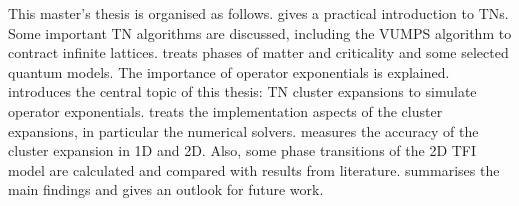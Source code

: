 This master's thesis is organised as follows.  gives a practical introduction to \Glspl{TN}. Some important \Gls{TN} algorithms are discussed, including the \Gls{VUMPS} algorithm to contract infinite lattices.  treats phases of matter and criticality and some selected quantum models. The importance of operator exponentials is explained.  introduces the central topic of this thesis: \Gls{TN} cluster expansions to simulate operator exponentials.  treats the implementation aspects of the cluster expansions, in particular the numerical solvers.  measures the accuracy of the cluster expansion in 1D and 2D. Also, some phase transitions of the 2D \Gls{TFI} model are calculated and compared with results from literature.  summarises the main findings and gives an outlook for future work.